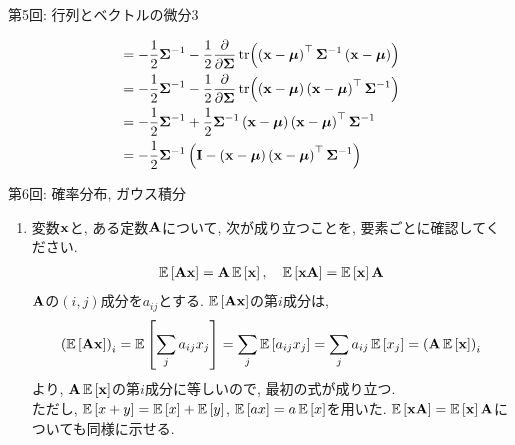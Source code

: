 \documentclass[dvipdfmx,notheorems,t]{beamer}
\begin{document}
\begin{frame}{第5回: 行列とベクトルの微分3}
\begin{enumerate}
\begin{align*}
    &= -\frac{1}{2} \vb{\Sigma}^{-1} - \frac{1}{2} \pdv{\vb{\Sigma}} \tr(
      \left( \vb{x} - \vb*{\mu} \right)^\top \vb{\Sigma}^{-1}
      \left( \vb{x} - \vb*{\mu} \right)) \\
    &= -\frac{1}{2} \vb{\Sigma}^{-1} - \frac{1}{2} \pdv{\vb{\Sigma}} \tr(
      \left( \vb{x} - \vb*{\mu} \right) \left( \vb{x} - \vb*{\mu} \right)^\top
      \vb{\Sigma}^{-1}) \\
    &= -\frac{1}{2} \vb{\Sigma}^{-1} + \frac{1}{2} \vb{\Sigma}^{-1}
      \left( \vb{x} - \vb*{\mu} \right) \left( \vb{x} - \vb*{\mu} \right)^\top
      \vb{\Sigma}^{-1} \\
    &= -\frac{1}{2} \vb{\Sigma}^{-1} \left( \vb{I}
      - \left( \vb{x} - \vb*{\mu} \right) \left( \vb{x} - \vb*{\mu} \right)^\top
      \vb{\Sigma}^{-1} \right)
  \end{align*}
\end{enumerate}
\end{frame}

\begin{frame}{第6回: 確率分布, ガウス積分}
\begin{enumerate}
  \item 変数$\vb{x}$と, ある定数$\vb{A}$について, 次が成り立つことを, 要素ごとに確認してください.
  \begin{align*}
    \operatorname{\mathbb{E}} \left[ \vb{A} \vb{x} \right] = \vb{A} \operatorname{\mathbb{E}} \left[ \vb{x} \right], \quad
    \operatorname{\mathbb{E}} \left[ \vb{x} \vb{A} \right] = \operatorname{\mathbb{E}} \left[ \vb{x} \right] \vb{A}
  \end{align*}
  $\vb{A}$の$(i, j)$成分を$a_{ij}$とする.
  $\operatorname{\mathbb{E}} \left[ \vb{A} \vb{x} \right]$の第$i$成分は,
  \begin{align*}
    \left( \operatorname{\mathbb{E}} \left[ \vb{A} \vb{x} \right] \right)_i = \operatorname{\mathbb{E}} \left[ \sum_j a_{ij} x_j \right]
      = \sum_j \operatorname{\mathbb{E}} \left[ a_{ij} x_j \right] = \sum_j a_{ij} \operatorname{\mathbb{E}} \left[ x_j \right] = \left( \vb{A} \operatorname{\mathbb{E}} \left[ \vb{x} \right] \right)_i
  \end{align*}
  より, $\vb{A} \operatorname{\mathbb{E}} \left[ \vb{x} \right]$の第$i$成分に等しいので, 最初の式が成り立つ. \\
  ただし, $\operatorname{\mathbb{E}} \left[ x + y \right] = \operatorname{\mathbb{E}} \left[ x \right] + \operatorname{\mathbb{E}} \left[ y \right]$, $\operatorname{\mathbb{E}} \left[ ax \right] = a \operatorname{\mathbb{E}} \left[ x \right]$を用いた.
  $\operatorname{\mathbb{E}} \left[ \vb{x} \vb{A} \right] = \operatorname{\mathbb{E}} \left[ \vb{x} \right] \vb{A}$についても同様に示せる.
\end{enumerate}
\end{frame}
\end{document}

